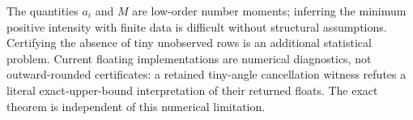 The quantities $a_i$ and $M$ are low-order number moments; inferring the minimum positive intensity with finite data is difficult without structural assumptions. Certifying the absence of tiny unobserved rows is an additional statistical problem. Current floating implementations are numerical diagnostics, not outward-rounded certificates: a retained tiny-angle cancellation witness refutes a literal exact-upper-bound interpretation of their returned floats. The exact theorem is independent of this numerical limitation.
